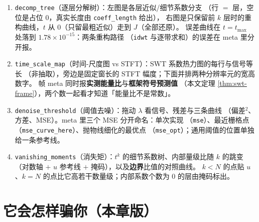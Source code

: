 \begin{enumerate}
  \item \texttt{decomp\_tree}（逐层分解树）：左图是各层近似/细节系数分支
        （行 $=$ 层，空位是占位 $0$，真实长度由 \texttt{coeff\_length} 给出），
        右图是只保留前 $k$ 层时的重构曲线，$t$ 从 $0$（只留最粗近似）走到 $J$（全部还原）。
        误差曲线在 $t=t_{\max}$ 处落到 $1.78\times10^{-15}$：两条重构路径
        （\texttt{idwt} 与逐带求和）的误差在 meta 里分开报。
  \item \texttt{time\_scale\_map}（时间-尺度图 vs STFT）：SWT 系数热力图的每行与信号等长
        （非抽取），旁边是固定窗长的 STFT 幅度；下面并排两种分辨率元的宽高数字。
        帧 meta 同时报\textbf{实测能量比}与\textbf{框架符号预测值}
        （本文定理 \ref{thm:swt-frame}），两个数一起看才知道「能量比不是常数」。
  \item \texttt{denoise\_threshold}（阈值去噪）：拖动 $\lambda$ 看信号、残差与三条曲线
        （偏差$^2$、方差、MSE）。meta 里三个 MSE 分开命名：单次实现
        （\texttt{mse}）、最近栅格点（\texttt{mse\_curve\_here}）、抛物线细化的最优点
        （\texttt{mse\_opt}）；通用阈值的位置单独给一条参考线。
  \item \texttt{vanishing\_moments}（消失矩）：$t^k$ 的细节系数树、内部量级比随 $k$ 的跳变
        （对数轴 $+$ $u$ 参考线 $+$ 掩码），以及\textbf{边界}比值的对照曲线。
        $k<N$ 的点贴 $u$、$k=N$ 的点比它高若干数量级；内部系数个数为 $0$ 的层由掩码标出。
\end{enumerate}



\section{它会怎样骗你（本章版）}

